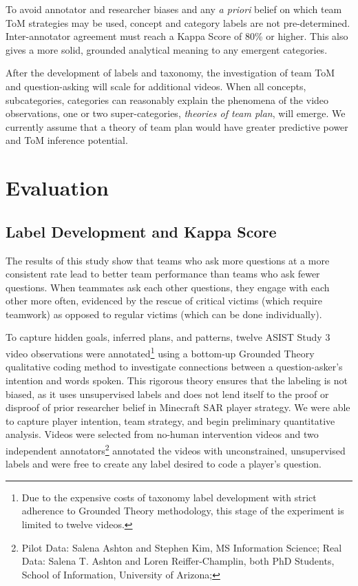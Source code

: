 To avoid annotator and researcher biases and any \emph{a priori} belief on
which team ToM strategies may be used, concept and category labels are not
pre-determined. Inter-annotator agreement must reach a Kappa Score of 80\% or
higher. This also gives a more solid, grounded analytical meaning to any
emergent categories. 

After the development of labels and taxonomy, the investigation of team ToM and
question-asking will scale for additional videos. When all concepts,
subcategories, categories can reasonably explain the phenomena of the video
observations, one or two super-categories, \emph{theories of team plan}, will
emerge. We currently assume that a theory of team plan would have greater
predictive power and ToM inference potential. 






\section{Evaluation}

\subsection{Label Development and Kappa Score}
The results of this study show that teams who ask more questions at a more consistent rate lead to better team performance than teams who ask fewer questions. When teammates ask each other questions, they engage with each other more often, evidenced by the rescue of critical victims (which require teamwork) as opposed to regular victims (which can be done individually). 

To capture hidden goals, inferred plans, and patterns, twelve ASIST Study 3 video observations were annotated\footnote{Due to the expensive costs of taxonomy label development with strict adherence to Grounded Theory methodology, this stage of the experiment is limited to twelve videos.} using a bottom-up Grounded Theory qualitative coding method to investigate connections between a question-asker's intention and words spoken. This rigorous theory ensures that the labeling is not biased, as it uses unsupervised labels and does not lend itself to the proof or disproof of prior researcher
belief in Minecraft SAR player strategy.  We were able to capture player intention, team strategy, and begin preliminary quantitative analysis. Videos were selected from no-human intervention videos and two independent annotators\footnote{Pilot Data: Salena Ashton and Stephen Kim, MS Information Science; Real Data: Salena T. Ashton and Loren Reiffer-Champlin, both PhD Students, School of Information, University of Arizona; } annotated the videos with unconstrained, unsupervised labels and were free to create any label desired to code a player's question.

